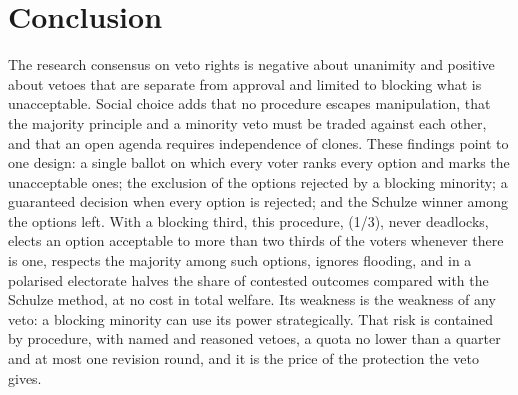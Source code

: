 \section{Conclusion}\label{sec:conclusion}

The research consensus on veto rights is negative about unanimity and positive about vetoes that are
separate from approval and limited to blocking what is unacceptable. Social choice adds that no procedure
escapes manipulation, that the majority principle and a minority veto must be traded against each other,
and that an open agenda requires independence of clones. These findings point to one design: a single
ballot on which every voter ranks every option and marks the unacceptable ones; the exclusion of the
options rejected by a blocking minority; a guaranteed decision when every option is rejected; and the
Schulze winner among the options left. With a blocking third, this procedure, \QVC(1/3), never deadlocks,
elects an option acceptable to more than two thirds of the voters whenever there is one, respects the
majority among such options, ignores flooding, and in a polarised electorate halves the share of
contested outcomes compared with the Schulze method, at no cost in total welfare. Its weakness is the
weakness of any veto: a blocking minority can use its power strategically. That risk is contained by
procedure, with named and reasoned vetoes, a quota no lower than a quarter and at most one revision
round, and it is the price of the protection the veto gives.
